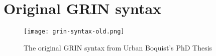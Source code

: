 \documentclass[main.tex]{subfiles}
\begin{document}
	
	\section{Original GRIN syntax}
	\begin{figure}[H]
		\label{fig:grin-syntax-old}
		\centering
		\texttt{[image: grin-syntax-old.png]}
		\caption{The original GRIN syntax from Urban Boquist's PhD Thesis}
	\end{figure}
	
\end{document}
